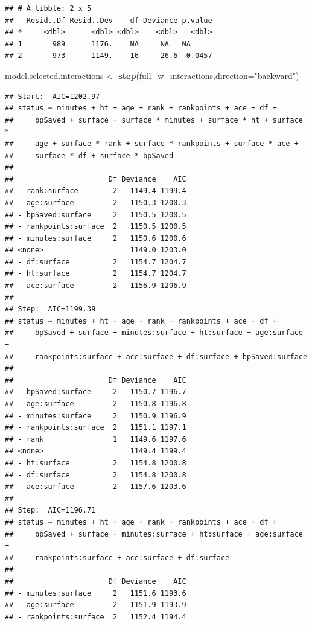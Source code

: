 \documentclass[]{article}
\newenvironment{Shaded}{\begin{snugshade}}{\end{snugshade}}
\newcommand{\DataTypeTok}[1]{\textcolor[rgb]{0.13,0.29,0.53}{#1}}
\newcommand{\KeywordTok}[1]{\textcolor[rgb]{0.13,0.29,0.53}{\textbf{#1}}}
\newcommand{\NormalTok}[1]{#1}
\newcommand{\StringTok}[1]{\textcolor[rgb]{0.31,0.60,0.02}{#1}}
\begin{document}
\begin{verbatim}
## # A tibble: 2 x 5
##   Resid..Df Resid..Dev    df Deviance p.value
## *     <dbl>      <dbl> <dbl>    <dbl>   <dbl>
## 1       989      1176.    NA     NA   NA     
## 2       973      1149.    16     26.6  0.0457
\end{verbatim}

\begin{Shaded}
\begin{Highlighting}[]
\NormalTok{model.selected.interactions <-}\StringTok{ }\KeywordTok{step}\NormalTok{(full_w_interactions,}\DataTypeTok{direction=}\StringTok{"backward"}\NormalTok{)}
\end{Highlighting}
\end{Shaded}

\begin{verbatim}
## Start:  AIC=1202.97
## status ~ minutes + ht + age + rank + rankpoints + ace + df + 
##     bpSaved + surface + surface * minutes + surface * ht + surface * 
##     age + surface * rank + surface * rankpoints + surface * ace + 
##     surface * df + surface * bpSaved
## 
##                      Df Deviance    AIC
## - rank:surface        2   1149.4 1199.4
## - age:surface         2   1150.3 1200.3
## - bpSaved:surface     2   1150.5 1200.5
## - rankpoints:surface  2   1150.5 1200.5
## - minutes:surface     2   1150.6 1200.6
## <none>                    1149.0 1203.0
## - df:surface          2   1154.7 1204.7
## - ht:surface          2   1154.7 1204.7
## - ace:surface         2   1156.9 1206.9
## 
## Step:  AIC=1199.39
## status ~ minutes + ht + age + rank + rankpoints + ace + df + 
##     bpSaved + surface + minutes:surface + ht:surface + age:surface + 
##     rankpoints:surface + ace:surface + df:surface + bpSaved:surface
## 
##                      Df Deviance    AIC
## - bpSaved:surface     2   1150.7 1196.7
## - age:surface         2   1150.8 1196.8
## - minutes:surface     2   1150.9 1196.9
## - rankpoints:surface  2   1151.1 1197.1
## - rank                1   1149.6 1197.6
## <none>                    1149.4 1199.4
## - ht:surface          2   1154.8 1200.8
## - df:surface          2   1154.8 1200.8
## - ace:surface         2   1157.6 1203.6
## 
## Step:  AIC=1196.71
## status ~ minutes + ht + age + rank + rankpoints + ace + df + 
##     bpSaved + surface + minutes:surface + ht:surface + age:surface + 
##     rankpoints:surface + ace:surface + df:surface
## 
##                      Df Deviance    AIC
## - minutes:surface     2   1151.6 1193.6
## - age:surface         2   1151.9 1193.9
## - rankpoints:surface  2   1152.4 1194.4

\end{verbatim}
\end{document}
